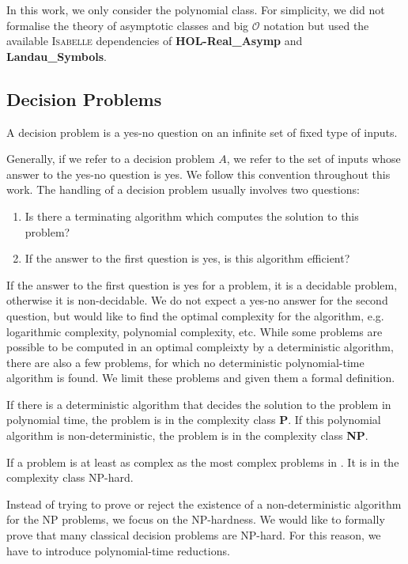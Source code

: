 In this work, we only consider the polynomial class. For simplicity, we did not 
formalise the theory of asymptotic classes and big $\mathcal{O}$ notation but used the 
available \textsc{Isabelle} dependencies of \textbf{HOL-Real\_Asymp} and \textbf{Landau\_Symbols}.

\subsection*{Decision Problems}
\begin{definition}
    A decision problem is a yes-no question on an infinite set of fixed type of inputs.
\end{definition}
Generally, if we refer to a decision problem $A$, we refer to the set of inputs whose answer to the yes-no question is yes. 
We follow this convention throughout this work.
The handling of a decision problem usually involves two questions:
\begin{enumerate}
    \item Is there a terminating algorithm which computes the solution to this problem?
    \item If the answer to the first question is yes, is this algorithm efficient?
\end{enumerate}
If the answer to the first question is yes for a problem, it is a decidable problem, otherwise it is non-decidable. 
We do not expect a yes-no answer for the second question, but would like to find 
the optimal complexity for the algorithm, e.g. logarithmic complexity, polynomial complexity, etc. 
While some problems are possible to be computed in an optimal compleixty by a deterministic algorithm, 
there are also a few problems, for which no deterministic polynomial-time algorithm is found. 
We limit these problems and given them a formal definition.
\begin{definition}
    If there is a deterministic algorithm that decides the solution 
    to the problem in polynomial time, the problem is in the complexity class \textbf{P}.
    If this polynomial algorithm is non-deterministic, the problem is in the complexity class \textbf{NP}. 
\end{definition}
\begin{definition}
If a problem is at least as complex as the most complex problems in \NP. It is 
    in the complexity class NP-hard.
\end{definition}

Instead of trying to prove or reject the existence of a non-deterministic algorithm 
for the NP problems, we focus on the NP-hardness. We would like to formally prove 
that many classical decision problems are NP-hard. For this reason, we have to introduce polynomial-time reductions.


